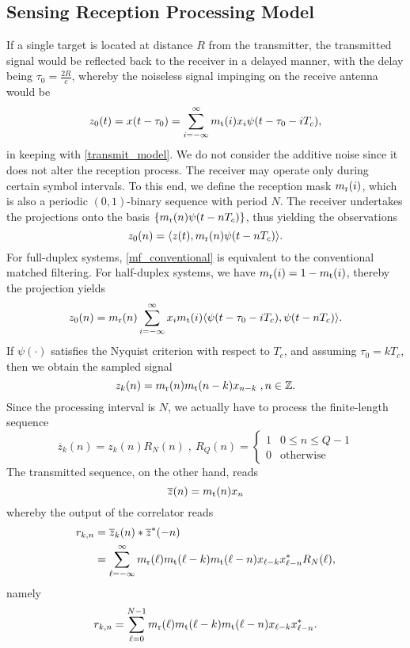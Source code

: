 \documentclass[journal,a4paper,10pt, romanappendices]{IEEEtran}
\begin{document}
\subsection{Sensing Reception Processing Model}
If a single target is located at distance $R$ from the transmitter, the transmitted signal would be reflected back to the receiver in a delayed manner, with the delay being $\tau_0=\frac{2R}{c}$, whereby the noiseless signal impinging on the receive antenna would be
\[
z_0(t)=x(t-\tau_0)=\sum_{i=-\infty}^\infty m_{\rm t}(i)x_i\psi(t-\tau_0-iT_c),
\]
in keeping with \eqref{transmit_model}. We do not consider the additive noise since it does not alter the reception process. The receiver may operate only during certain symbol intervals. To this end, we define the reception mask $m_{\rm r}(i)$, which is also a periodic $(0,1)$-binary sequence with period $N$. The receiver undertakes the projections onto the basis 
$\{m_{\rm r}(n)\psi(t-nT_c)\}$, thus yielding the observations
\begin{equation}\label{mf_conventional}
z_0(n)=\langle z(t), m_{\rm r}(n)\psi(t-nT_c)\rangle.  
\end{equation}
For full-duplex systems, \eqref{mf_conventional} is equivalent to the conventional matched filtering. For half-duplex systems, we have $m_{\rm r}(i)=1-m_{\rm t}(i)$, thereby the projection yields
$$
z_0(n)=m_{\rm r}(n)\sum_{i=-\infty}^\infty x_im_{\rm t}(i)\langle\psi(t-\tau_0-iT_c),\psi(t-nT_c)\rangle.
$$
If $\psi (\cdot )$ satisfies the Nyquist criterion with respect to $T_c$, and assuming $\tau_0=kT_c$, then we obtain the sampled signal
\[
z_k(n)=m_{\rm r}(n)m_{\rm t}(n-k)x_{n-k} \; , n \in \mathbb{Z}.
\]
Since the processing interval is $N$, we actually have to process the finite-length sequence
\[
\overline{z}_k(n)=z_k(n)R_{N}(n) \; ,~ R_{Q}(n)= \left\{
\begin{array}{ll}
1 & 0 \leq n \leq Q-1\\
0 & \mbox{otherwise}
\end{array} \right.
\]
The transmitted sequence, on the other hand, reads
\[
\overline{z}(n)=m_{\rm t}(n)x_{n}
\]
whereby the output of the correlator reads
\begin{align}
r_{k,n}&=\overline{z}_k(n)*\overline{z}^*(-n) \nonumber\\
&=\sum_{\ell=-\infty}^\infty m_{\rm r}(\ell)m_{\rm t}(\ell-k)
m_{\rm t}(\ell-n)x_{\ell-k}x^*_{\ell-n}R_{N}(\ell),\nonumber
\end{align}
namely
\begin{equation}\label{mf_output}
r_{k,n}=\sum_{\ell=0}^{N-1} m_{\rm r}(\ell)m_{\rm t}(\ell-k)
m_{\rm t}(\ell-n)x_{\ell-k}x^*_{\ell-n}.
\end{equation}
\end{document}
